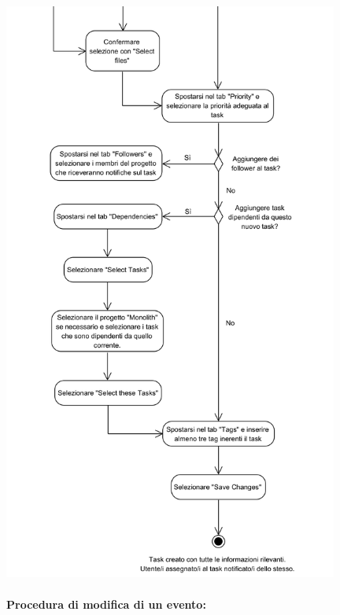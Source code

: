\begin{center}
	\includegraphics[width=11cm]{./DiagrammiProcedure/CreazioneTask2.png}
\end{center}

\newpage
\paragraph{Procedura di modifica di un evento:}


